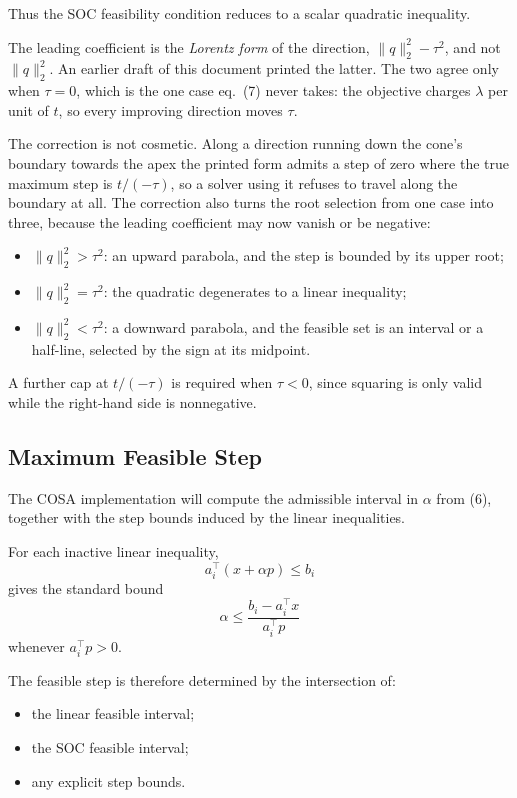 \documentclass[11pt,a4paper]{article}
\begin{document}
Thus the SOC feasibility condition reduces to a scalar quadratic
inequality.

The leading coefficient is the \emph{Lorentz form} of the direction,
$\|q\|_2^2-\tau^2$, and not $\|q\|_2^2$. An earlier draft of this
document printed the latter. The two agree only when $\tau=0$, which
is the one case eq.~(7) never takes: the objective charges $\lambda$
per unit of $t$, so every improving direction moves $\tau$.

The correction is not cosmetic. Along a direction running down the
cone's boundary towards the apex the printed form admits a step of
zero where the true maximum step is $t/(-\tau)$, so a solver using it
refuses to travel along the boundary at all. The correction also turns
the root selection from one case into three, because the leading
coefficient may now vanish or be negative:

\begin{itemize}
    \item $\|q\|_2^2>\tau^2$: an upward parabola, and the step is
    bounded by its upper root;
    \item $\|q\|_2^2=\tau^2$: the quadratic degenerates to a linear
    inequality;
    \item $\|q\|_2^2<\tau^2$: a downward parabola, and the feasible
    set is an interval or a half-line, selected by the sign at its
    midpoint.
\end{itemize}

A further cap at $t/(-\tau)$ is required when $\tau<0$, since squaring
is only valid while the right-hand side is nonnegative.

\subsection{Maximum Feasible Step}

The COSA implementation will compute the admissible interval in
$\alpha$ from (6), together with the step bounds induced by the
linear inequalities.

For each inactive linear inequality,
\[
a_i^\top(x+\alpha p)\leq b_i
\]
gives the standard bound
\[
\alpha
\leq
\frac{b_i-a_i^\top x}{a_i^\top p}
\]
whenever $a_i^\top p>0$.

The feasible step is therefore determined by the intersection of:

\begin{itemize}
    \item the linear feasible interval;
    \item the SOC feasible interval;
    \item any explicit step bounds.
\end{itemize}
\end{document}
